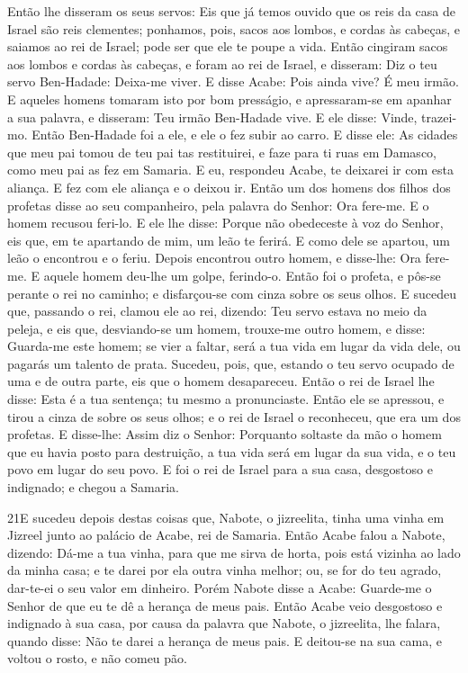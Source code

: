 Então lhe disseram os seus servos: Eis que já temos ouvido que os
reis da casa de Israel são reis clementes; ponhamos, pois, sacos aos
lombos, e cordas às cabeças, e saiamos ao rei de Israel; pode ser
que ele te poupe a vida. Então cingiram sacos aos lombos e
cordas às cabeças, e foram ao rei de Israel, e disseram: Diz o teu
servo Ben-Hadade: Deixa-me viver. E disse Acabe: Pois ainda vive? É
meu irmão. E aqueles homens tomaram isto por bom presságio, e
apressaram-se em apanhar a sua palavra, e disseram: Teu irmão
Ben-Hadade vive. E ele disse: Vinde, trazei-mo. Então Ben-Hadade foi
a ele, e ele o fez subir ao carro. E disse ele: As cidades
que meu pai tomou de teu pai tas restituirei, e faze para ti ruas em
Damasco, como meu pai as fez em Samaria. E eu, respondeu Acabe, te
deixarei ir com esta aliança. E fez com ele aliança e o deixou ir.
Então um dos homens dos filhos dos profetas disse ao seu
companheiro, pela palavra do Senhor: Ora fere-me. E o homem recusou
feri-lo. E ele lhe disse: Porque não obedeceste à voz do
Senhor, eis que, em te apartando de mim, um leão te ferirá. E como
dele se apartou, um leão o encontrou e o feriu. Depois
encontrou outro homem, e disse-lhe: Ora fere-me. E aquele homem
deu-lhe um golpe, ferindo-o. Então foi o profeta, e pôs-se
perante o rei no caminho; e disfarçou-se com cinza sobre os seus
olhos. E sucedeu que, passando o rei, clamou ele ao rei,
dizendo: Teu servo estava no meio da peleja, e eis que, desviando-se
um homem, trouxe-me outro homem, e disse: Guarda-me este homem; se
vier a faltar, será a tua vida em lugar da vida dele, ou pagarás um
talento de prata. Sucedeu, pois, que, estando o teu servo
ocupado de uma e de outra parte, eis que o homem desapareceu. Então
o rei de Israel lhe disse: Esta é a tua sentença; tu mesmo a
pronunciaste. Então ele se apressou, e tirou a cinza de sobre
os seus olhos; e o rei de Israel o reconheceu, que era um dos
profetas. E disse-lhe: Assim diz o Senhor: Porquanto soltaste
da mão o homem que eu havia posto para destruição, a tua vida será
em lugar da sua vida, e o teu povo em lugar do seu povo. E
foi o rei de Israel para a sua casa, desgostoso e indignado; e
chegou a Samaria.

\medskip

\lettrine{21} E sucedeu depois destas coisas que, Nabote, o
jizreelita, tinha uma vinha em Jizreel junto ao palácio de Acabe,
rei de Samaria. Então Acabe falou a Nabote, dizendo: Dá-me a tua
vinha, para que me sirva de horta, pois está vizinha ao lado da
minha casa; e te darei por ela outra vinha melhor; ou, se for do teu
agrado, dar-te-ei o seu valor em dinheiro. Porém Nabote disse a
Acabe: Guarde-me o Senhor de que eu te dê a herança de meus pais.
Então Acabe veio desgostoso e indignado à sua casa, por causa da
palavra que Nabote, o jizreelita, lhe falara, quando disse: Não te
darei a herança de meus pais. E deitou-se na sua cama, e voltou o
rosto, e não comeu pão.


